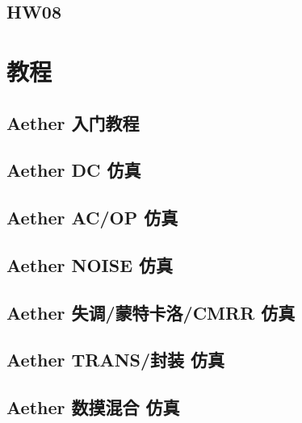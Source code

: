 \documentclass[cn,11pt,english,black,simple,device=ppt]{elegantbook}
\begin{document}
 

\chapter{HW08}

 

\part{教程}

\chapter{Aether 入门教程}

 


\chapter{Aether DC 仿真}

 

\chapter{Aether AC/OP 仿真}

 

\chapter{Aether NOISE 仿真}

 


\chapter{Aether 失调/蒙特卡洛/CMRR 仿真}

 



\chapter{Aether TRANS/封装 仿真}

 



\chapter{Aether 数摸混合 仿真}

 
\end{document}
